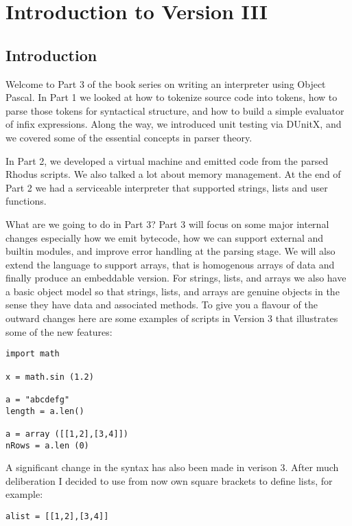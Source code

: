 {\bfseries\sffamily\huge\color{ChapterTitleColor} \chapter{Introduction to Version III}} \label{chap:interpreters }

\section{Introduction}

Welcome to Part 3 of the book series on writing an interpreter using Object Pascal. In Part 1 we looked at how to tokenize source code into tokens, how to parse those tokens for syntactical structure, and how to build a simple evaluator of infix expressions. Along the way, we introduced unit testing via DUnitX, and we covered some of the essential concepts in parser theory.

In Part 2, we developed a virtual machine and emitted code from the parsed Rhodus scripts. We also talked a lot about memory management. At the end of Part 2 we had a serviceable interpreter that supported strings, lists and user functions.

What are we going to do in Part 3? Part 3 will focus on some major internal changes especially how we emit bytecode, how we can support external and builtin modules, and improve error handling at the parsing stage. We will also extend the language to support arrays, that is homogenous arrays of data and finally produce an embeddable version. For strings, lists, and arrays we also have a basic object model so that strings, lists, and arrays are genuine objects in the sense they have data and associated methods. To give you a flavour of the outward changes here are some examples of scripts in Version 3 that illustrates some of the new features:

\begin{lstlisting}
import math

x = math.sin (1.2)

a = "abcdefg"
length = a.len()

a = array ([[1,2],[3,4]])
nRows = a.len (0)
\end{lstlisting}

A significant change in the syntax has also been made in verison 3. After much deliberation I decided to use from now own square brackets to define lists, for example:

\begin{lstlisting}
alist = [[1,2],[3,4]]
\end{lstlisting}

